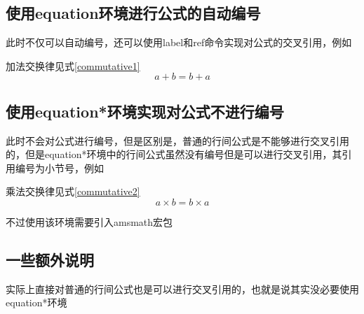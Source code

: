 \documentclass{ctexart}
\begin{document}
		\subsection{使用equation环境进行公式的自动编号}
		此时不仅可以自动编号，还可以使用label和ref命令实现对公式的交叉引用，例如
		
		加法交换律见式\ref{commutative1}
			\begin{equation}
				a + b = b + a \label{commutative1}
			\end{equation}
		
		\subsection{使用equation*环境实现对公式不进行编号}
		此时不会对公式进行编号，但是区别是，普通的行间公式是不能够进行交叉引用的，但是equation*环境中的行间公式虽然没有编号但是可以进行交叉引用，其引用编号为小节号，例如
		
		乘法交换律见式\ref{commutative2}
			\begin{equation*}
				a \times b = b \times a  \label{commutative2}
			\end{equation*}
		
		不过使用该环境需要引入amsmath宏包
		
		\subsection{一些额外说明}
		实际上直接对普通的行间公式也是可以进行交叉引用的，也就是说其实没必要使用equation*环境
	
	
\end{document}
